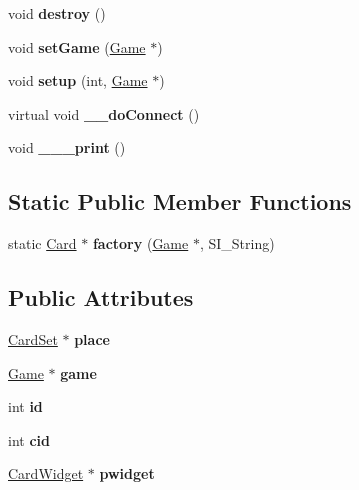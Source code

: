 \begin{DoxyCompactItemize}
void {\bfseries destroy} ()
\item 
\mbox{\label{class_card_ad89cc3cf4c2afb10381655bf5940dec6}} 
void {\bfseries set\+Game} (\hyperlink{class_game}{Game} $\ast$)
\item 
\mbox{\label{class_card_afda7a2a346514b795d979494c68f5e15}} 
void {\bfseries setup} (int, \hyperlink{class_game}{Game} $\ast$)
\item 
\mbox{\label{class_card_aaf4b38dccc9e9d2cec7db8e1a8fa2efc}} 
virtual void {\bfseries \+\_\+\+\_\+do\+Connect} ()
\item 
\mbox{\label{class_card_a8a9fdf9ebc85896727159f11886b0bea}} 
void {\bfseries \+\_\+\+\_\+\+\_\+print} ()
\end{DoxyCompactItemize}
\subsection*{Static Public Member Functions}
\begin{DoxyCompactItemize}
\item 
\mbox{\label{class_card_abce1758283c642a8465655e855acc763}} 
static \hyperlink{class_card}{Card} $\ast$ {\bfseries factory} (\hyperlink{class_game}{Game} $\ast$, S\+I\+\_\+\+String)
\end{DoxyCompactItemize}
\subsection*{Public Attributes}
\begin{DoxyCompactItemize}
\item 
\mbox{\label{class_card_aae5c395ef6504102afea9bbf68a7bf73}} 
\hyperlink{class_card_set}{Card\+Set} $\ast$ {\bfseries place}
\item 
\mbox{\label{class_card_a525e165be1a96a9c76b6b3959d8f67f6}} 
\hyperlink{class_game}{Game} $\ast$ {\bfseries game}
\item 
\mbox{\label{class_card_ae6fb6f495bba4d639696f934b495c15f}} 
int {\bfseries id}
\item 
\mbox{\label{class_card_a79a46e893cf63f7aa582800bea836eb3}} 
int {\bfseries cid}
\item 
\mbox{\label{class_card_a30038db90de96f57756bb88d1fbfb05f}} 
\hyperlink{class_card_widget}{Card\+Widget} $\ast$ {\bfseries pwidget}
\end{DoxyCompactItemize}
